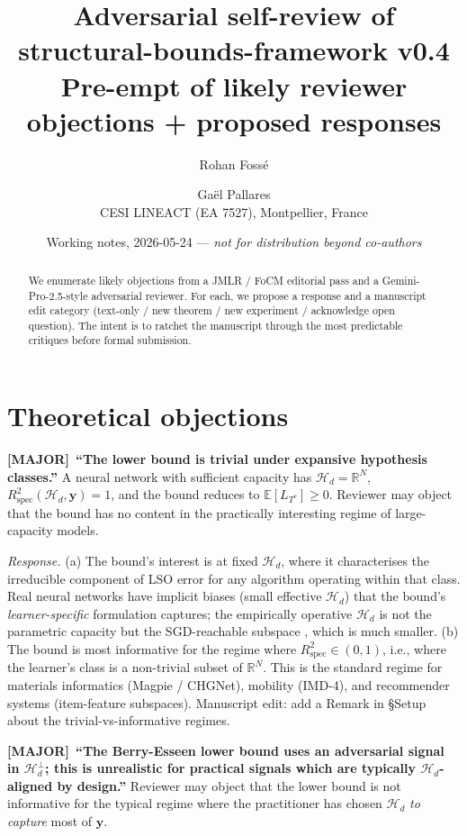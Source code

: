 \documentclass[11pt,a4paper]{article}
\title{\textbf{Adversarial self-review of structural-bounds-framework v0.4}\\
\large{Pre-empt of likely reviewer objections + proposed responses}}
\author{Rohan Fossé \and Gaël Pallares\\
\small{CESI LINEACT (EA 7527), Montpellier, France}}
\date{Working notes, 2026-05-24 --- \emph{not for distribution beyond co-authors}}
\theoremstyle{plain}
\newcommand{\by}{\mathbf{y}}
\newcommand{\E}{\mathbb{E}}
\newcommand{\R}{\mathbb{R}}
\newcommand{\Rspec}{R^2_{\mathrm{spec}}}
\newcommand{\Hcal}{\mathcal{H}}
\newcommand{\Major}{\textcolor{majorobj}{\textbf{[MAJOR]}}\ }
\begin{document}
\maketitle

\begin{abstract}
We enumerate likely objections from a JMLR / FoCM editorial pass and
a Gemini-Pro-2.5-style adversarial reviewer.  For each, we propose a
response and a manuscript edit category (text-only / new theorem /
new experiment / acknowledge open question).  The intent is to ratchet
the manuscript through the most predictable critiques before formal
submission.
\end{abstract}

\section{Theoretical objections}

\Major \textbf{``The lower bound is trivial under expansive hypothesis
classes.''}  A neural network with sufficient capacity has
$\Hcal_d = \R^N$, $\Rspec(\Hcal_d, \by) = 1$, and the bound reduces
to $\E[L_{T^c}] \geq 0$.  Reviewer may object that the bound has no
content in the practically interesting regime of large-capacity
models.

\emph{Response.} (a) The bound's interest is at fixed $\Hcal_d$, where
it characterises the irreducible component of LSO error for any
algorithm operating within that class.  Real neural networks have
implicit biases (small effective $\Hcal_d$) that the bound's
\emph{learner-specific} formulation captures; the empirically operative
$\Hcal_d$ is not the parametric capacity but the SGD-reachable subspace
\citep{NeyshaburTomiokaSrebro2014}, which is much smaller.
(b) The bound is most informative for the regime where $\Rspec
\in (0, 1)$, i.e., where the learner's class is a non-trivial subset of
$\R^N$.  This is the standard regime for materials informatics
(Magpie / CHGNet), mobility (IMD-4), and recommender systems
(item-feature subspaces).  Manuscript edit: add a Remark in
§Setup about the trivial-vs-informative regimes.

\smallskip
\Major \textbf{``The Berry-Esseen lower bound uses an adversarial signal
in $\Hcal_d^\perp$; this is unrealistic for practical signals which are
typically $\Hcal_d$-aligned by design.''}  Reviewer may object that the
lower bound is not informative for the typical regime where the
practitioner has chosen $\Hcal_d$ \emph{to capture} most of $\by$.
\end{document}
